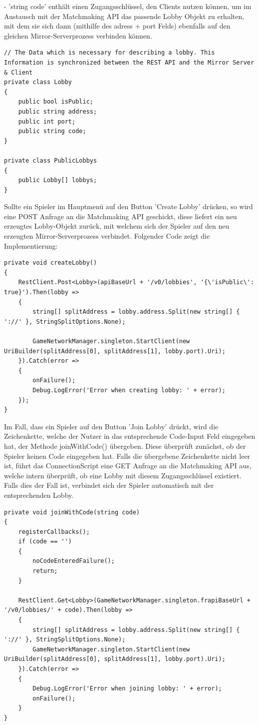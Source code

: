 - 'string code' enthält einen Zugangsschlüssel, den Clients nutzen können, um im Austausch mit der Matchmaking API das passende Lobby Objekt zu erhalten, mit dem sie sich dann (mithilfe des adress + port Felds) ebenfalls auf den gleichen Mirror-Serverprozess verbinden können.

\begin{lstlisting}[caption= ConnectionScript.cs Matchmaking Data]
// The Data which is necessary for describing a lobby. This Information is synchronized between the REST API and the Mirror Server & Client
private class Lobby
{
	public bool isPublic;
	public string address;
	public int port;
	public string code;
}

private class PublicLobbys
{
	public Lobby[] lobbys;
}
\end{lstlisting}

Sollte ein Spieler im Hauptmenü auf den Button 'Create Lobby' drücken, so wird eine POST Anfrage an die Matchmaking API geschickt, diese liefert ein neu erzeugtes Lobby-Objekt zurück, mit welchem sich der Spieler auf den neu erzeugten Mirror-Serverprozess verbindet. Folgender Code zeigt die Implementierung:

\begin{lstlisting}[caption= ConnectionScript.cs createLobby()]
private void createLobby()
{
	RestClient.Post<Lobby>(apiBaseUrl + '/v0/lobbies', '{\'isPublic\': true}').Then(lobby =>
	{
		string[] splitAddress = lobby.address.Split(new string[] { '://' }, StringSplitOptions.None);
		
		GameNetworkManager.singleton.StartClient(new UriBuilder(splitAddress[0], splitAddress[1], lobby.port).Uri);
	}).Catch(error =>
	{
		onFailure();
		Debug.LogError('Error when creating lobby: ' + error);
	});
}	
\end{lstlisting}

Im Fall, dass ein Spieler auf den Button 'Join Lobby' drückt, wird die Zeichenkette, welche der Nutzer in das entsprechende Code-Input Feld eingegeben hat, der Methode joinWithCode() übergeben. Diese überprüft zunächst, ob der Spieler keinen Code eingegeben hat. Falls die übergebene Zeichenkette nicht leer ist, führt das ConnectionScript eine GET Anfrage an die Matchmaking API aus, welche intern überprüft, ob eine Lobby mit diesem Zugangsschlüssel existiert. Falls dies der Fall ist, verbindet sich der Spieler automatisch mit der entsprechenden Lobby. 

\begin{lstlisting}[caption= ConnectionScript.cs joinWithCode()]
private void joinWithCode(string code)
{
	registerCallbacks();
	if (code == '')
	{
		noCodeEnteredFailure();
		return;
	}
			
	RestClient.Get<Lobby>(GameNetworkManager.singleton.frapiBaseUrl + '/v0/lobbies/' + code).Then(lobby =>
	{
		string[] splitAddress = lobby.address.Split(new string[] { '://' }, StringSplitOptions.None);
		GameNetworkManager.singleton.StartClient(new UriBuilder(splitAddress[0], splitAddress[1], lobby.port).Uri);
	}).Catch(error =>
	{
		Debug.LogError('Error when joining lobby: ' + error);
		onFailure();
	}
}
\end{lstlisting}

